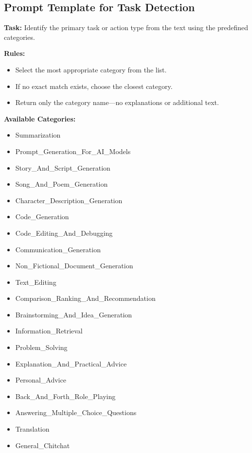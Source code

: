\subsection{ Prompt Template for Task Detection}
\label{appendix_task_detection}
\begin{tcolorbox}[
    colback=gray!5, colframe=black, coltitle=white, colbacktitle=gray!70, 
    fonttitle=\bfseries, title=Task Detection Prompt Template, 
    boxrule=0.8pt, width=0.8\textwidth, sharp corners, boxsep=0.5mm, 
    left=0.5mm, right=0.5mm, top=0.5mm, bottom=0.5mm]
    
\scriptsize
\textbf{Task:} Identify the primary task or action type from the text using the predefined categories.

\textbf{Rules:}
\begin{itemize}\itemsep0pt
    \item Select the most appropriate category from the list.
    \item If no exact match exists, choose the closest category.
    \item Return only the category name—no explanations or additional text.
\end{itemize}

\textbf{Available Categories:}
\begin{itemize}\itemsep0pt
    \item Summarization
    \item Prompt\_Generation\_For\_AI\_Models
    \item Story\_And\_Script\_Generation
    \item Song\_And\_Poem\_Generation
    \item Character\_Description\_Generation
    \item Code\_Generation
    \item Code\_Editing\_And\_Debugging
    \item Communication\_Generation
    \item Non\_Fictional\_Document\_Generation
    \item Text\_Editing
    \item Comparison\_Ranking\_And\_Recommendation
    \item Brainstorming\_And\_Idea\_Generation
    \item Information\_Retrieval
    \item Problem\_Solving
    \item Explanation\_And\_Practical\_Advice
    \item Personal\_Advice
    \item Back\_And\_Forth\_Role\_Playing
    \item Answering\_Multiple\_Choice\_Questions
    \item Translation
    \item General\_Chitchat
\end{itemize}


\end{tcolorbox}
